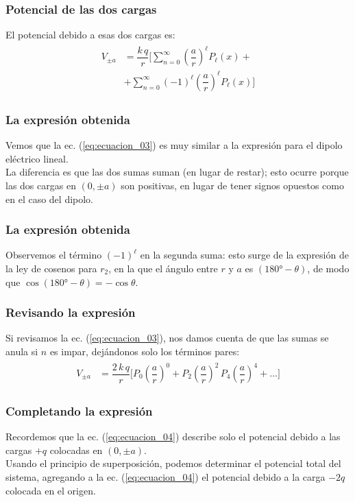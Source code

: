\documentclass[12pt]{beamer}
\begin{document}
\begin{frame}
\frametitle{Potencial de las dos cargas}
El potencial debido a esas dos cargas es:
\pause
\begin{align}
\begin{aligned}
V_{\pm a} &= \dfrac{k \, q}{r} \bigg[ \sum_{n=0}^{\infty} \left( \dfrac{a}{r} \right)^{\ell} P_{\ell}(x) + \\[0.5em]
&+ \sum_{n=0}^{\infty} (-1)^{\ell} \left( \dfrac{a}{r} \right)^{\ell} P_{\ell}(x) \bigg]
\end{aligned}
\label{eq:ecuacion_03}
\end{align}
\end{frame}
\begin{frame}
\frametitle{La expresión obtenida}
Vemos que la ec. (\ref{eq:ecuacion_03}) es muy similar a la expresión para el dipolo eléctrico lineal.
\\
\bigskip
\pause
La diferencia es que las dos sumas suman (en lugar de restar); esto ocurre porque las dos cargas en $(0, \pm a)$ son positivas, en lugar de tener signos opuestos como en el caso del dipolo.
\end{frame}
\begin{frame}
\frametitle{La expresión obtenida}
Observemos el término $(-1)^{\ell}$ en la segunda suma: esto surge de la expresión de la ley de cosenos para $r_{2}$, en la que el ángulo entre $r$ y $a$ es $(\ang{180} - \theta)$, de modo que $\cos (\ang{180} - \theta) = - \cos \theta$.
\end{frame}
\begin{frame}
\frametitle{Revisando la expresión}
Si revisamos la ec. (\ref{eq:ecuacion_03}), nos damos cuenta de que las sumas se anula si $n$ es impar, dejándonos solo los términos pares:
\begin{align}
\begin{aligned}
V_{\pm a} &= \dfrac{2 \, k \, q}{r} \bigg[ P_{0} \left( \dfrac{a}{r} \right)^{0} + P_{2} \left( \dfrac{a}{r} \right)^{2} \, P_{4} \left( \dfrac{a}{r} \right)^{4} + \ldots \bigg]
\end{aligned}
\label{eq:ecuacion_04}
\end{align}
\end{frame}
\begin{frame}
\frametitle{Completando la expresión}
Recordemos que la ec. (\ref{eq:ecuacion_04}) describe solo el potencial debido a las cargas $+q$ colocadas en $(0, \pm a)$.
\\
\bigskip
\pause
Usando el principio de superposición, podemos determinar el potencial total del sistema, agregando a la ec. (\ref{eq:ecuacion_04}) el potencial debido a la carga $-2q$ colocada en el origen.
\end{frame}
\end{document}
